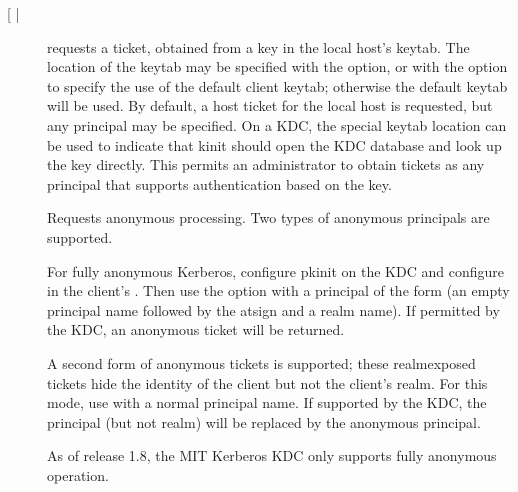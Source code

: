 \documentclass[letterpaper,10pt,english]{sphinxmanual}
\begin{document}
\begin{description}
\item[{ {[} |  \sphinxstyleemphasis{keytab\_file}{]}}] \leavevmode
\sphinxAtStartPar
requests a ticket, obtained from a key in the local host’s keytab.
The location of the keytab may be specified with the 
 option, or with the  option to specify the use
of the default client keytab; otherwise the default keytab will be
used.  By default, a host ticket for the local host is requested,
but any principal may be specified.  On a KDC, the special keytab
location  can be used to indicate that kinit should open
the KDC database and look up the key directly.  This permits an
administrator to obtain tickets as any principal that supports
authentication based on the key.

\item[{}] \leavevmode
\sphinxAtStartPar
Requests anonymous processing.  Two types of anonymous principals
are supported.

\sphinxAtStartPar
For fully anonymous Kerberos, configure pkinit on the KDC and
configure  in the client’s .
Then use the  option with a principal of the form 
(an empty principal name followed by the at\sphinxhyphen{}sign and a realm
name).  If permitted by the KDC, an anonymous ticket will be
returned.

\sphinxAtStartPar
A second form of anonymous tickets is supported; these
realm\sphinxhyphen{}exposed tickets hide the identity of the client but not the
client’s realm.  For this mode, use  with a normal
principal name.  If supported by the KDC, the principal (but not
realm) will be replaced by the anonymous principal.

\sphinxAtStartPar
As of release 1.8, the MIT Kerberos KDC only supports fully
anonymous operation.

\end{description}
\end{document}
